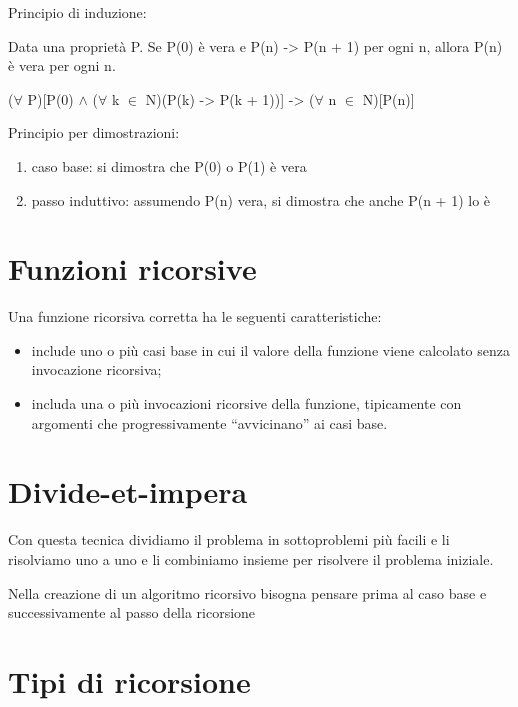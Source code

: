 \documentclass[
]{article}
\providecommand{\tightlist}{%
  \setlength{\itemsep}{0pt}\setlength{\parskip}{0pt}}
\begin{document}
{}

{Principio di induzione:}

{Data una proprietà P. Se P(0) è vera e P(n) -> P(n + 1) per ogni n,
allora P(n) è vera per ogni n.}

{}

{($\forall$ P){[}P(0) $\land$   ($\forall$ k $\in$  N)(P(k) -> P(k + 1)){]} -> ($\forall$ n $\in$  N){[}P(n){]}}

{}

{Principio per dimostrazioni:}

\begin{enumerate}
\tightlist
\item
  {caso base}{: si dimostra che P(0) o P(1) è vera}
\item
  {passo induttivo}{: assumendo P(n) vera, si dimostra che anche P(n +
  1) lo è}
\end{enumerate}

\section{\texorpdfstring{{Funzioni
ricorsive}}{Funzioni ricorsive}}\label{h.sb4u5goi2m76}

{Una funzione ricorsiva corretta ha le seguenti caratteristiche: }

\begin{itemize}
\tightlist
\item
  {include uno o più casi base in cui il valore della funzione viene
  calcolato senza invocazione ricorsiva; }
\item
  {includa una o più invocazioni ricorsive della funzione, tipicamente
  con argomenti che progressivamente ``avvicinano'' ai casi base.}
\end{itemize}

\section{\texorpdfstring{{Divide-et-impera}}{Divide-et-impera}}\label{h.d8xcg1dahtzr}

{Con questa tecnica dividiamo il problema in sottoproblemi più facili e
li risolviamo uno a uno e li combiniamo insieme per risolvere il
problema iniziale.}

{}

{Nella creazione di un algoritmo ricorsivo bisogna pensare prima al caso
base e successivamente al passo della ricorsione}

\section{\texorpdfstring{{Tipi di
ricorsione}}{Tipi di ricorsione}}\label{h.z1x5cub3xoqy}
\end{document}
